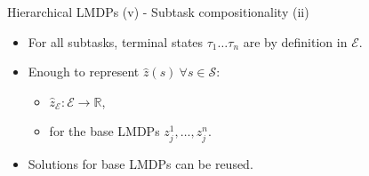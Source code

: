 \documentclass{beamer}
\theoremstyle{mystyle}
\newtheorem*{remark}{Remark}
\newcommand{\cE}{\mathcal{E}}
\newcommand{\cS}{\mathcal{S}}
\begin{document}
\begin{frame}{Hierarchical LMDPs (v) - Subtask compositionality (ii)}


    \begin{itemize}


        \item For all subtasks, terminal states $\tau_1 \dots \tau_n$ are by definition in $\cE$.
        \item Enough to represent $\hat z(s) \ \forall s \in \cS$:
              \begin{itemize}
                  \item $\hat{z}_\cE:\cE\rightarrow\mathbb{R}$,
                  \item for the base LMDPs {\color{blue} $z_j^1,\ldots,z_j^n$}.
              \end{itemize}
        \item Solutions for base LMDPs {\color{blue} can be reused}.

    \end{itemize}

\end{frame}



%    
%    
%    
%    
\end{document}
